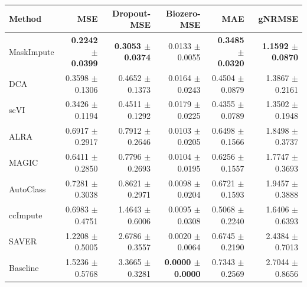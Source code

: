 \begin{tabular}{@{}lrrrrr@{}}
\toprule
Method & MSE & Dropout-MSE & Biozero-MSE & MAE & gNRMSE \\
\midrule
MaskImpute & \textbf{0.2242 $\pm$ 0.0399} & \textbf{0.3053 $\pm$ 0.0374} & 0.0133 $\pm$ 0.0055 & \textbf{0.3485 $\pm$ 0.0320} & \textbf{1.1592 $\pm$ 0.0870} \\
DCA & 0.3598 $\pm$ 0.1306 & 0.4652 $\pm$ 0.1373 & 0.0164 $\pm$ 0.0243 & 0.4504 $\pm$ 0.0879 & 1.3867 $\pm$ 0.2161 \\
scVI & 0.3426 $\pm$ 0.1194 & 0.4511 $\pm$ 0.1292 & 0.0179 $\pm$ 0.0225 & 0.4355 $\pm$ 0.0789 & 1.3502 $\pm$ 0.1948 \\
ALRA & 0.6917 $\pm$ 0.2917 & 0.7912 $\pm$ 0.2646 & 0.0103 $\pm$ 0.0205 & 0.6498 $\pm$ 0.1566 & 1.8498 $\pm$ 0.3737 \\
MAGIC & 0.6411 $\pm$ 0.2850 & 0.7796 $\pm$ 0.2693 & 0.0104 $\pm$ 0.0195 & 0.6256 $\pm$ 0.1557 & 1.7747 $\pm$ 0.3693 \\
AutoClass & 0.7281 $\pm$ 0.3038 & 0.8621 $\pm$ 0.2971 & 0.0098 $\pm$ 0.0204 & 0.6721 $\pm$ 0.1593 & 1.9457 $\pm$ 0.3888 \\
ccImpute & 0.6983 $\pm$ 0.4751 & 1.4643 $\pm$ 0.6006 & 0.0095 $\pm$ 0.0308 & 0.5068 $\pm$ 0.2240 & 1.6406 $\pm$ 0.6393 \\
SAVER & 1.2208 $\pm$ 0.5005 & 2.6786 $\pm$ 0.3557 & 0.0020 $\pm$ 0.0064 & 0.6745 $\pm$ 0.2190 & 2.4384 $\pm$ 0.7013 \\
Baseline & 1.5236 $\pm$ 0.5768 & 3.3665 $\pm$ 0.3281 & \textbf{0.0000 $\pm$ 0.0000} & 0.7343 $\pm$ 0.2569 & 2.7044 $\pm$ 0.8656 \\
\bottomrule
\end{tabular}
